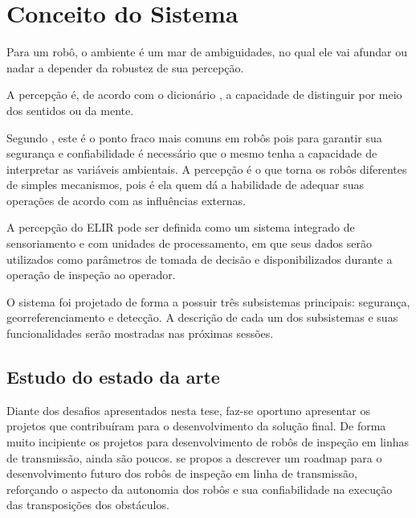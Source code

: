 \chapter{Conceito do Sistema}
\label{chap:concep}

\begin{flushright}
   \begin{list}{}{
      \setlength{\leftmargin}{4.5cm}
      \setlength{\rightmargin}{0cm}
      \setlength{\labelwidth}{0pt}
      \setlength{\labelsep}{\leftmargin}}
      \item Para um robô, o ambiente é um mar de ambiguidades, no qual ele vai afundar ou nadar a depender da robustez de sua percepção.
      \begin{list}{}{
      \setlength{\leftmargin}{0cm}
      \setlength{\rightmargin}{0cm}
      \setlength{\labelwidth}{0pt}
      \setlength{\labelsep}{\leftmargin}}
      \item \cite{Fitzpatrick}
      \end{list}
   \end{list}
\end{flushright}

A percepção é, de acordo com o dicionário , a capacidade de distinguir por meio dos sentidos ou da mente.

Segundo , este é o ponto fraco mais comuns em robôs pois para garantir sua segurança e confiabilidade é necessário que o mesmo tenha a capacidade de interpretar as variáveis ambientais. A percepção é o que torna os robôs diferentes de simples mecanismos, pois é ela quem dá a habilidade de adequar suas operações de acordo com as influências externas.

A percepção do ELIR pode ser definida como um sistema integrado de sensoriamento e com unidades de processamento, em que seus dados serão utilizados como parâmetros de tomada de decisão e disponibilizados durante a operação de inspeção ao operador.

O sistema foi projetado de forma a possuir três subsistemas principais: segurança, georreferenciamento e detecção. A descrição de cada um dos subsistemas e suas funcionalidades serão mostradas nas próximas sessões.



\section{Estudo do estado da arte}
\label{sec:sota}
Diante dos desafios apresentados nesta tese, faz-se oportuno apresentar os projetos que contribuíram para o desenvolvimento da solução final. De forma muito incipiente os projetos para desenvolvimento de robôs de inspeção em linhas de transmissão, ainda são poucos.  se propos a descrever um roadmap para o desenvolvimento futuro dos robôs de inspeção em linha de transmissão, reforçando o aspecto da autonomia dos robôs e sua confiabilidade na execução das transposições dos obstáculos.

